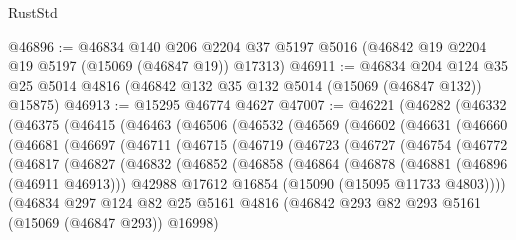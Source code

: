 \begin{lexlean}{RustStd}
\begin{coremodule}
@46896 := @46834
    @140
    @206
    @2204
    @37
    @5197
    @5016
    (@46842 @19 @2204 @19 @5197 (@15069 (@46847 @19)) @17313)
@46911 := @46834
    @204
    @124
    @35
    @25
    @5014
    @4816
    (@46842 @132 @35 @132 @5014 (@15069 (@46847 @132)) @15875)
@46913 := @15295 @46774 @4627
@47007 := @46221
    (@46282
      (@46332
        (@46375
          (@46415
            (@46463
              (@46506
                (@46532
                  (@46569
                    (@46602
                      (@46631
                        (@46660
                          (@46681
                            (@46697
                              (@46711
                                (@46715
                                  (@46719
                                    (@46723
                                      (@46727
                                        (@46754
                                          (@46772
                                            (@46817
                                              (@46827
                                                (@46832
                                                  (@46852
                                                    (@46858
                                                      (@46864
                                                        (@46878
                                                          (@46881 (@46896 (@46911 @46913)))
                                                          @42988
                                                          @17612
                                                          @16854
                                                          (@15090 (@15095 @11733 @4803))))
                                                      (@46834
                                                        @297
                                                        @124
                                                        @82
                                                        @25
                                                        @5161
                                                        @4816
                                                        (@46842
                                                          @293
                                                          @82
                                                          @293
                                                          @5161
                                                          (@15069 (@46847 @293))
                                                          @16998)

\end{coremodule}
\end{lexlean}

